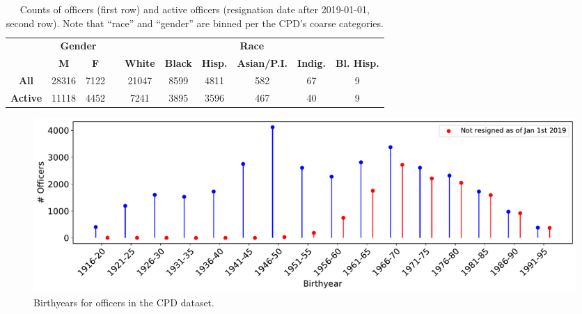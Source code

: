 \begin{table}[t!]
\caption{Counts of officers (first row) and active officers (resignation date after 2019-01-01, second row). 
Note that ``race'' and ``gender'' are binned per the CPD's coarse categories.} \label{tab:stats}
\begin{tabular}{l|c|c|c|c|c|c|c|c|c|}
\cline{2-3} \cline{5-10}
                                               & \multicolumn{2}{c|}{\textbf{Gender}} & \multicolumn{1}{l|}{} & \multicolumn{6}{c|}{\textbf{Race}}                                                                                                                                                   \\ \cline{2-3} \cline{5-10} 
                                               & {\textbf{M}}   & {\textbf{F}}   &                       & {\textbf{White}} & {\textbf{Black}} & \multicolumn{1}{l|}{{\textbf{Hisp.}}} & {\textbf{Asian/P.I.}} & \multicolumn{1}{l|}{{\textbf{Indig.}}} & {\textbf{Bl. Hisp.}} \\ \cline{1-3} \cline{5-10} 
\multicolumn{1}{|c|}{\textbf{All}}    & 28316                 & 7122                  &                       & 21047                   & 8599                    & 4811                                         & 582                     & 67                                              & 9                           \\ \cline{1-3} \cline{5-10} 
\multicolumn{1}{|c|}{\textbf{Active}} & 11118                 & 4452                  &                       & 7241                    & 3895                    & 3596                                         & 467                     & 40                                              & 9                           \\ \cline{1-3} \cline{5-10} 
\end{tabular} 
\end{table}

\begin{figure}[h] 
	\includegraphics[width=\textwidth]{figs/history_by} 
	\caption{Birthyears for officers in the CPD dataset.} \label{fig:history_by}
\end{figure}

